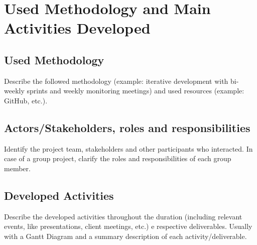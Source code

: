 \section{Used Methodology and Main Activities Developed}
\label{section:methodology}

\subsection{Used Methodology}

Describe the followed methodology (example: iterative development with bi-weekly sprints and weekly monitoring meetings) and used resources (example: GitHub, etc.).

\subsection{Actors/Stakeholders, roles and responsibilities}

Identify the project team, stakeholders and other participants who interacted.
In case of a group project, clarify the roles and responsibilities of each group member.

\subsection{Developed Activities}

Describe the developed activities throughout the duration (including relevant events, like presentations, client meetings, etc.) e respective deliverables.
Usually with a Gantt Diagram and a summary description of each activity/deliverable.